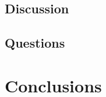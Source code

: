 \documentclass[12pt]{article}
\begin{document}
\subsection{Discussion}

\subsection{Questions}
	
\section{Conclusions}
\end{document}
